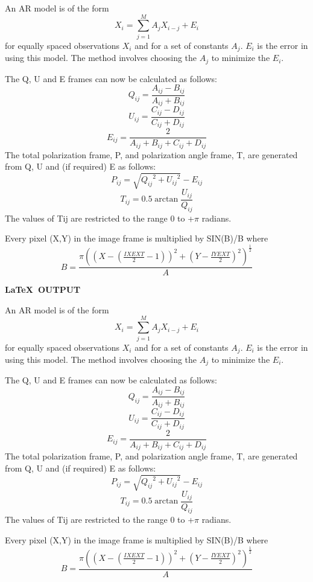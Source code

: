 \documentclass[twoside,11pt]{starlink}
\begin{document}
\begin{terminalv}
An AR model is of the form
\begin{equation}
  X_{i}=\sum_{j=1}^{M} A_{j}X_{i-j}+E_{i}
\end{equation}
for equally spaced observations $X_{i}$ and for a set of constants $A_{j}$.
$E_{i}$ is the error in using this model.
The method involves choosing the $A_{j}$ to minimize the $E_{i}$.

The Q, U and E frames can now be calculated as follows:
\[Q_{ij}=\frac{A_{ij}-B_{ij}}{A_{ij}+B_{ij}}\]
\[U_{ij}=\frac{C_{ij}-D_{ij}}{C_{ij}+D_{ij}}\]
\[E_{ij}=\frac{2}{A_{ij}+B_{ij}+C_{ij}+D_{ij}}\]
The total polarization frame, P, and polarization angle frame, T, are generated
from Q, U and (if required) E as follows:
\[P_{ij}=\sqrt{{Q_{ij}}^{2}+{U_{ij}}^{2}}-E_{ij}\]
\[T_{ij}=0.5\arctan \frac{U_{ij}}{Q_{ij}}\]
The values of Tij are restricted to the range 0 to +$\pi$ radians.

Every pixel (X,Y) in the image frame is multiplied by SIN(B)/B where
\begin{displaymath}
  B=\frac {\pi( (X-(\frac{IXEXT}{2}-1))^{2} +
  (Y-\frac{IYEXT}{2})^{2} )^{\frac{1}{2}}} {A}
\end{displaymath}
\end{terminalv}

\newpage

\begin{center}
  \textbf{\LaTeX\ OUTPUT}
\end{center}

An AR model is of the form
\begin{equation}
  X_{i}=\sum_{j=1}^{M} A_{j}X_{i-j}+E_{i}
\end{equation}
for equally spaced observations $X_{i}$ and for a set of constants $A_{j}$.
$E_{i}$ is the error in using this model.
The method involves choosing the $A_{j}$ to minimize the $E_{i}$.

The Q, U and E frames can now be calculated as follows:
\[Q_{ij}=\frac{A_{ij}-B_{ij}}{A_{ij}+B_{ij}}\]
\[U_{ij}=\frac{C_{ij}-D_{ij}}{C_{ij}+D_{ij}}\]
\[E_{ij}=\frac{2}{A_{ij}+B_{ij}+C_{ij}+D_{ij}}\]
The total polarization frame, P, and polarization angle frame, T, are generated
from Q, U and (if required) E as follows:
\[P_{ij}=\sqrt{{Q_{ij}}^{2}+{U_{ij}}^{2}}-E_{ij}\]
\[T_{ij}=0.5\arctan \frac{U_{ij}}{Q_{ij}}\]
The values of Tij are restricted to the range 0 to +$\pi$ radians.

Every pixel (X,Y) in the image frame is multiplied by SIN(B)/B where
\begin{displaymath}
  B=\frac {\pi( (X-(\frac{IXEXT}{2}-1))^{2} +
  (Y-\frac{IYEXT}{2})^{2} )^{\frac{1}{2}}} {A}
\end{displaymath}
\newpage
\end{document}

